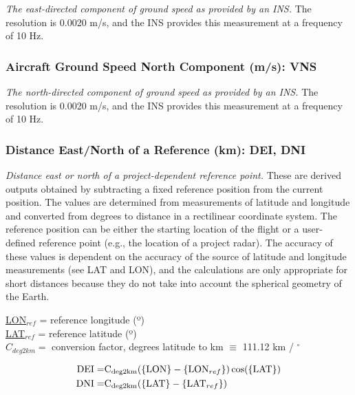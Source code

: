 \documentclass[
]{book}
\begin{document}
\emph{The east-directed component of ground speed as provided by an INS.} The resolution is 0.0020 m/s, and the INS provides this measurement at a frequency of 10 Hz.

\hypertarget{vns}{%
\subsubsection*{Aircraft Ground Speed North Component (m/s): VNS}\label{vns}}

\emph{The north-directed component of ground speed as provided by an INS.} The resolution is 0.0020 m/s, and the INS provides this measurement at a frequency of 10 Hz.

\hypertarget{dei-dni}{%
\subsubsection*{Distance East/North of a Reference (km): DEI, DNI}\label{dei-dni}}

\emph{Distance east or north of a project-dependent reference point.} These are derived outputs obtained by subtracting a fixed reference position from the current position. The values are determined from measurements of latitude and longitude and converted from degrees to distance in a rectilinear coordinate system. The reference position can be either the starting location of the flight or a user-defined reference point (e.g., the location of a project radar). The accuracy of these values is dependent on the accuracy of the source of latitude and longitude measurements (see LAT and LON), and the calculations are only appropriate for short distances because they do not take into account the spherical geometry of the Earth.

\protect\hyperlink{longitude}{LON}\(_{ref}\) = reference longitude (º)\\
\protect\hyperlink{latitude}{LAT}\(_{ref}\) = reference latitude (º)\\
\(C_{deg2km}=\) conversion factor, degrees latitude to km
\(\equiv\) 111.12 km / \(^{\circ}\)

\begin{equation}
\begin{split}
\mathrm{DEI} = & \mathrm{C_{deg2km}}(\mathrm{\{LON\}}-\{\mathrm{LON}_{ref}\})\cos(\mathrm{\{LAT\}}) \notag \\ 
\mathrm{DNI} = & \mathrm{C_{deg2km}}(\mathrm{\{LAT\}}-\{\mathrm{LAT}_{ref}\})  
\end{split}
\label{eq:DNSEW}
\end{equation}
\end{document}
